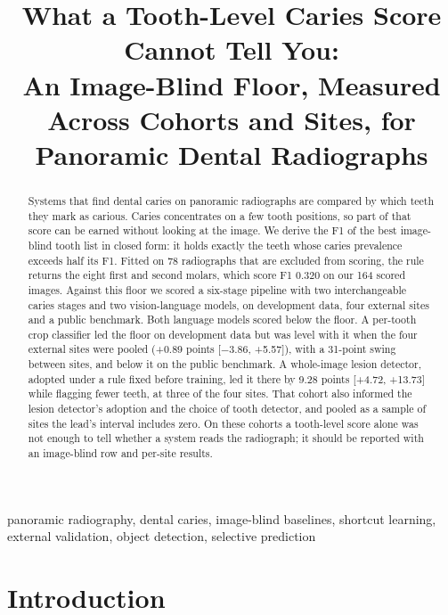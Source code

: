 \documentclass[conference]{IEEEtran}
\begin{document}
\title{What a Tooth-Level Caries Score Cannot Tell You:\\ An Image-Blind Floor, Measured Across Cohorts and Sites, for Panoramic Dental Radiographs}
\author{
}
\maketitle
\begin{abstract}
Systems that find dental caries on panoramic radiographs are compared by which teeth they mark as carious. Caries concentrates on a few tooth positions, so part of that score can be earned without looking at the image. We derive the F1 of the best image-blind tooth list in closed form: it holds exactly the teeth whose caries prevalence exceeds half its F1. Fitted on 78 radiographs that are excluded from scoring, the rule returns the eight first and second molars, which score F1 0.320 on our 164 scored images. Against this floor we scored a six-stage pipeline with two interchangeable caries stages and two vision-language models, on development data, four external sites and a public benchmark. Both language models scored below the floor. A per-tooth crop classifier led the floor on development data but was level with it when the four external sites were pooled (+0.89 points [$-$3.86, +5.57]), with a 31-point swing between sites, and below it on the public benchmark. A whole-image lesion detector, adopted under a rule fixed before training, led it there by 9.28 points [+4.72, +13.73] while flagging fewer teeth, at three of the four sites. That cohort also informed the lesion detector's adoption and the choice of tooth detector, and pooled as a sample of sites the lead's interval includes zero. On these cohorts a tooth-level score alone was not enough to tell whether a system reads the radiograph; it should be reported with an image-blind row and per-site results.
\end{abstract}
\begin{IEEEkeywords}
panoramic radiography, dental caries, image-blind baselines, shortcut learning, external validation, object detection, selective prediction
\end{IEEEkeywords}

\section{Introduction}
\end{document}

